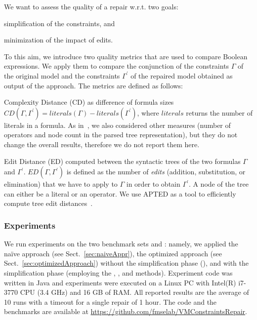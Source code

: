 \begin{tikzborder}{\cite{Gargantini16:validation}}
\begin{tikzborder}{\cite{gargantini_combinatorial_2017}}
\begin{tikzborder}{\cite{garn2019}}
\begin{tikzborder}{\cite{arcaini2019achieving}}
\begin{tikzborder}{\cite{arcaini2019varivolution}}
		\bb We want to assess the quality of a repair w.r.t. two goals:
		\begin{inparaenum}[(i)]
			\item simplification of the constraints, and
			\item minimization of the impact of edits.
		\end{inparaenum}
		To this aim, we introduce two quality metrics that are used to compare Boolean expressions. We apply them to compare the conjunction of the constraints $\Gamma$ of the original model \m and the constraints $\Gamma^\prime$ of the repaired model \mRep obtained as output of the approach. The metrics are defined as follows:
		\begin{compactitem}
			\item{Complexity Distance (\textsf{CD})} as difference of formula sizes $\mathit{CD}(\Gamma, \Gamma^\prime) = \mathit{literals}(\Gamma) - \mathit{literals}(\Gamma^\prime)$, where $\mathit{literals}$ returns the number of literals in a formula. As in~\cite{vonRhein2015}, we also considered other measures (number of operators and node count in the parsed tree representation), but they do not change the overall results, therefore we do not report them here.
			\item {Edit Distance (\textsf{ED})} computed between the syntactic trees of the two formulas $\Gamma$ and $\Gamma^\prime$. $\mathit{ED}(\Gamma, \Gamma^\prime)$ is defined as the number of {\it edits} (addition, substitution, or elimination) that we have to apply to $\Gamma$ in order to obtain $\Gamma^\prime$. A node of the tree can either be a literal or an operator. We use \textsf{APTED} as a tool to efficiently compute tree edit distances~\cite{pawlik_tree_2016}.
		\end{compactitem}
		\be
		
		\subsubsection{Experiments}\label{sec:evaluation}
		
		\bb We run experiments on the two benchmark sets \benchMut and \benchReal: namely, we applied the na{\"i}ve approach (see Sect.~\ref{sec:naiveAppr}), the optimized approach (see Sect.~\ref{sec:optimizedApproach}) without the \textsf{simplification} phase (\textsf{\onlySelection}), and with the \textsf{simplification} phase (employing the \atgt, \espresso, \jbool and \qm methods). Experiment code was written in Java and experiments were executed on a Linux PC with Intel(R) i7-3770 CPU (3.4 GHz) and 16 GB of RAM. All reported results are the average of 10 runs with a timeout for a single repair of 1 hour. The code and the benchmarks are available at \url{https://github.com/fmselab/VMConstraintsRepair}.
		

\end{tikzborder}
\end{tikzborder}
\end{tikzborder}
\end{tikzborder}
\end{tikzborder}
